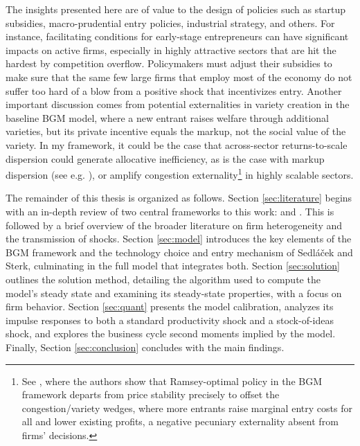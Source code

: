 \documentclass[a4paper,12pt]{article} %
\numberwithin{equation}{section} %
\numberwithin{figure}{section}
\numberwithin{table}{section}
\begin{document}
The insights presented here are of value to the design of policies such as startup subsidies, macro-prudential entry policies, industrial strategy, and others.
For instance, facilitating conditions for early-stage entrepreneurs can have significant impacts on active firms, especially in highly attractive sectors that are
hit the hardest by competition overflow. Policymakers must adjust their subsidies to make sure that the same few large firms that employ most of the economy do not
suffer too hard of a blow from a positive shock that incentivizes entry. Another important discussion comes from potential externalities in variety creation in the baseline BGM 
model, where a new entrant raises welfare through additional varieties, but its private incentive equals the markup, not the social value of the variety.
In my framework, it could be the case that across-sector returns-to-scale dispersion could generate allocative inefficiency, 
as is the case with markup dispersion (see e.g. \cite{baqaee2020productivity}), or amplify congestion 
externality\footnote{ See \textcite{bilbiie2014optimal}, where the authors show that Ramsey-optimal policy in the BGM framework departs from
price stability precisely to offset the congestion/variety wedges, where more entrants raise marginal entry costs for all and lower existing profits, a 
negative pecuniary externality absent from firms' decisions.} in highly scalable sectors. 

The remainder of this thesis is organized as follows. Section \ref{sec:literature} begins with an in-depth review of two central frameworks 
to this work: \textcite{bilbiie2012endogenous} and \textcite{sedlavcek2017growth}. This is followed by a brief overview of the broader literature 
on firm heterogeneity and the transmission of shocks. Section \ref{sec:model} introduces the key elements of the BGM framework and the technology 
choice and entry mechanism of Sedláček and Sterk, culminating in the full model that integrates both. Section \ref{sec:solution} outlines the 
solution method, detailing the algorithm used to compute the model’s steady state and examining its steady-state properties, with a focus on firm 
behavior. Section \ref{sec:quant} presents the model calibration, analyzes its impulse responses to both a standard productivity shock and a 
stock-of-ideas shock, and explores the business cycle second moments implied by the model. Finally, Section \ref{sec:conclusion} 
concludes with the main findings.


\end{document}
